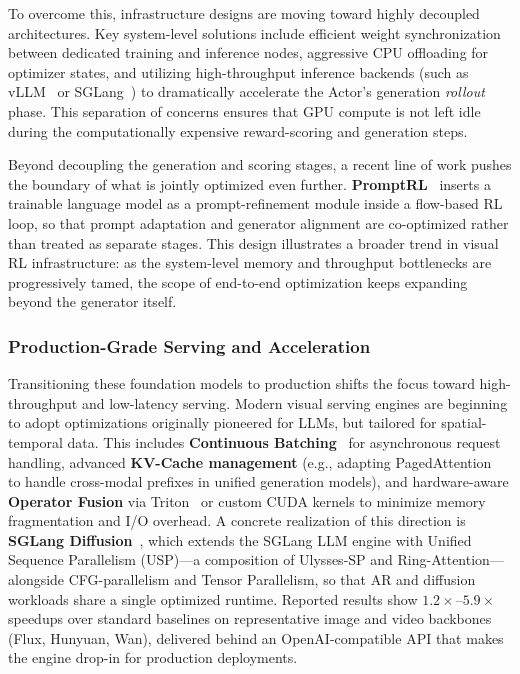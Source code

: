 To overcome this, infrastructure designs are moving toward highly decoupled architectures. Key system-level solutions include efficient weight synchronization between dedicated training and inference nodes, aggressive CPU offloading for optimizer states, and utilizing high-throughput inference backends (such as vLLM~\citep{kwon2023efficient} or SGLang~\citep{zheng2024sglang}) to dramatically accelerate the Actor's generation \emph{rollout} phase. This separation of concerns ensures that GPU compute is not left idle during the computationally expensive reward-scoring and generation steps.

Beyond decoupling the generation and scoring stages, a recent line of work pushes the boundary of what is jointly optimized even further. \textbf{PromptRL}~\citep{wang2026promptrl} inserts a trainable language model as a prompt-refinement module inside a flow-based RL loop, so that prompt adaptation and generator alignment are co-optimized rather than treated as separate stages. This design illustrates a broader trend in visual RL infrastructure: as the system-level memory and throughput bottlenecks are progressively tamed, the scope of end-to-end optimization keeps expanding beyond the generator itself.

\subsubsection{Production-Grade Serving and Acceleration}
\label{subsubsec:infra_serving}
Transitioning these foundation models to production shifts the focus toward high-throughput and low-latency serving. Modern visual serving engines are beginning to adopt optimizations originally pioneered for LLMs, but tailored for spatial-temporal data. This includes \textbf{Continuous Batching}~\citep{yu2022orca} for asynchronous request handling, advanced \textbf{KV-Cache management} (e.g., adapting PagedAttention~\citep{kwon2023efficient} to handle cross-modal prefixes in unified generation models), and hardware-aware \textbf{Operator Fusion} via Triton~\citep{tillet2019triton} or custom CUDA kernels to minimize memory fragmentation and I/O overhead. A concrete realization of this direction is \textbf{SGLang Diffusion}~\citep{sglang-diffusion-2026}, which extends the SGLang LLM engine with Unified Sequence Parallelism (USP)---a composition of Ulysses-SP and Ring-Attention---alongside CFG-parallelism and Tensor Parallelism, so that AR and diffusion workloads share a single optimized runtime. Reported results show $1.2\times$--$5.9\times$ speedups over standard baselines on representative image and video backbones (Flux, Hunyuan, Wan), delivered behind an OpenAI-compatible API that makes the engine drop-in for production deployments.

